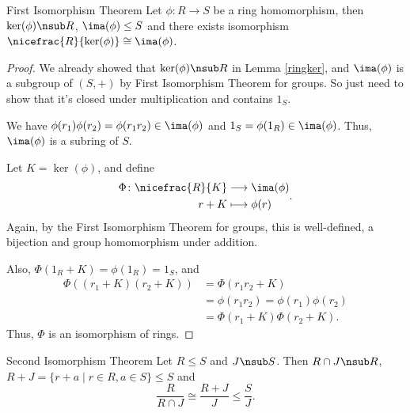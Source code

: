 \leavevmode
\begin{theorem}{First Isomorphism Theorem}{}
    Let \(\phi: R \to S\) be a ring homomorphism, then \(\ker(\phi) \nsub R\), \(\ima(\phi)\leq S\) and there exists isomorphism \(\nicefrac{R}{\ker(\phi)}\cong \ima(\phi)\).
\end{theorem}
\begin{proof}
    We already showed that \(\ker(\phi)\nsub R\) in Lemma \eqref{ringker}, and \(\ima(\phi)\) is a subgroup of \((S,+)\) by First Isomorphism Theorem for groups. So just need to show that it's closed under multiplication and contains \(1_S\).

    We have \(\phi(r_1)\phi(r_2) = \phi(r_1 r_2)\in \ima(\phi)\) and \(1_S = \phi(1_R) \in \ima(\phi)\). Thus, \(\ima(\phi)\) is a subring of \(S\).

    Let \(K = \ker(\phi)\), and define
    \[
    \begin{aligned}
      \Phi\colon \nicefrac{R}{K} & \longrightarrow \ima(\phi)      \\
      r+K          & \longmapsto \phi(r)
    \end{aligned}.
    \]
    Again, by the First Isomorphism Theorem for groups, this is well-defined, a bijection and group homomorphism under addition.

    Also, \(\Phi(1_R + K) = \phi(1_R) = 1_S\), and
    \begin{align*}
        \Phi((r_{1}+K)(r_2 + K)) &= \Phi(r_1 r_2 + K)\\
        &= \phi(r_{1} r_2) = \phi(r_1)\phi(r_2)\\
        &=\Phi(r_1 + K) \Phi(r_2 + K).
    \end{align*}
    Thus, \(\Phi\) is an isomorphism of rings.
\end{proof}
\begin{theorem}{Second Isomorphism Theorem}{}
    Let \(R\leq S\) and \(J \nsub S\). Then \(R \cap J \nsub R\), \(R + J = \{r + a \mid r \in R, a \in S\}\leq S\) and
    \[
        \frac{R}{R\cap J} \cong \frac{R + J}{J}\leq \frac{S}{J}.
    \]
\end{theorem}
